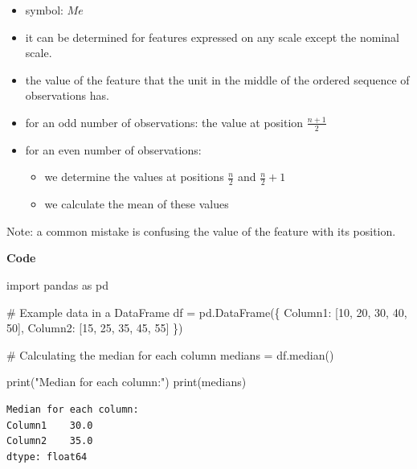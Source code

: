 \documentclass[
  english,
  letterpaper,
  DIV=11,
  numbers=noendperiod]{scrreprt}
\newenvironment{Shaded}{\begin{snugshade}}{\end{snugshade}}
\newcommand{\BuiltInTok}[1]{\textcolor[rgb]{0.00,0.23,0.31}{#1}}
\newcommand{\CommentTok}[1]{\textcolor[rgb]{0.37,0.37,0.37}{#1}}
\newcommand{\DecValTok}[1]{\textcolor[rgb]{0.68,0.00,0.00}{#1}}
\newcommand{\ImportTok}[1]{\textcolor[rgb]{0.00,0.46,0.62}{#1}}
\newcommand{\NormalTok}[1]{\textcolor[rgb]{0.00,0.23,0.31}{#1}}
\newcommand{\OperatorTok}[1]{\textcolor[rgb]{0.37,0.37,0.37}{#1}}
\newcommand{\StringTok}[1]{\textcolor[rgb]{0.13,0.47,0.30}{#1}}
\providecommand{\tightlist}{%
  \setlength{\itemsep}{0pt}\setlength{\parskip}{0pt}}
\begin{document}
\begin{itemize}
\tightlist
\item
  symbol: \(Me\)
\item
  it can be determined for features expressed on any scale except the
  nominal scale.
\item
  the value of the feature that the unit in the middle of the ordered
  sequence of observations has.
\item
  for an odd number of observations: the value at position
  \(\frac{n+1}{2}\)
\item
  for an even number of observations:

  \begin{itemize}
  \tightlist
  \item
    we determine the values at positions \(\frac{n}{2}\) and
    \(\frac{n}{2}+1\)
  \item
    we calculate the mean of these values
  \end{itemize}
\end{itemize}

Note: a common mistake is confusing the value of the feature with its
position.

\textbf{Code}

\begin{Shaded}
\begin{Highlighting}[]
\ImportTok{import}\NormalTok{ pandas }\ImportTok{as}\NormalTok{ pd}

\CommentTok{\# Example data in a DataFrame}
\NormalTok{df }\OperatorTok{=}\NormalTok{ pd.DataFrame(\{}
    \StringTok{\textquotesingle{}Column1\textquotesingle{}}\NormalTok{: [}\DecValTok{10}\NormalTok{, }\DecValTok{20}\NormalTok{, }\DecValTok{30}\NormalTok{, }\DecValTok{40}\NormalTok{, }\DecValTok{50}\NormalTok{],}
    \StringTok{\textquotesingle{}Column2\textquotesingle{}}\NormalTok{: [}\DecValTok{15}\NormalTok{, }\DecValTok{25}\NormalTok{, }\DecValTok{35}\NormalTok{, }\DecValTok{45}\NormalTok{, }\DecValTok{55}\NormalTok{]}
\NormalTok{\})}

\CommentTok{\# Calculating the median for each column}
\NormalTok{medians }\OperatorTok{=}\NormalTok{ df.median()}

\BuiltInTok{print}\NormalTok{(}\StringTok{"Median for each column:"}\NormalTok{)}
\BuiltInTok{print}\NormalTok{(medians)}
\end{Highlighting}
\end{Shaded}

\begin{verbatim}
Median for each column:
Column1    30.0
Column2    35.0
dtype: float64
\end{verbatim}
\end{document}
